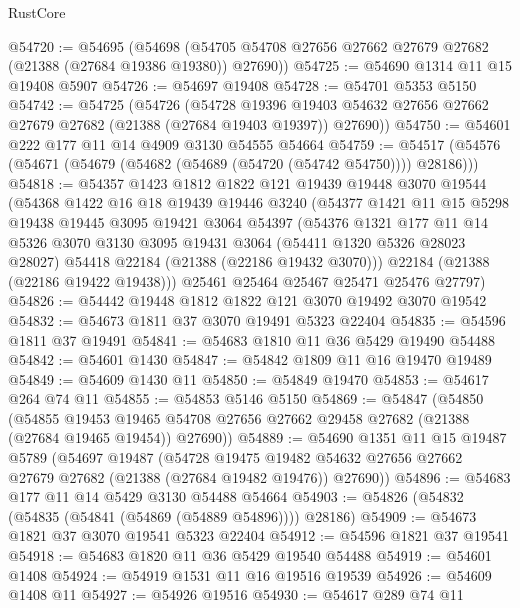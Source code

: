 \begin{lexlean}{RustCore}
\begin{coremodule}
@54720 := @54695
    (@54698 (@54705 @54708 @27656 @27662 @27679 @27682 (@21388 (@27684 @19386 @19380)) @27690))
@54725 := @54690 @1314 @11 @15 @19408 @5907
@54726 := @54697 @19408
@54728 := @54701 @5353 @5150
@54742 := @54725
    (@54726
      (@54728
        @19396
        @19403
        @54632
        @27656
        @27662
        @27679
        @27682
        (@21388 (@27684 @19403 @19397))
        @27690))
@54750 := @54601 @222 @177 @11 @14 @4909 @3130 @54555 @54664
@54759 := @54517 (@54576 (@54671 (@54679 (@54682 (@54689 (@54720 (@54742 @54750)))) @28186)))
@54818 := @54357
    @1423
    @1812
    @1822
    @121
    @19439
    @19448
    @3070
    @19544
    (@54368
      @1422
      @16
      @18
      @19439
      @19446
      @3240
      (@54377
        @1421
        @11
        @15
        @5298
        @19438
        @19445
        @3095
        @19421
        @3064
        @54397
        (@54376
          @1321
          @177
          @11
          @14
          @5326
          @3070
          @3130
          @3095
          @19431
          @3064
          (@54411 @1320 @5326 @28023 @28027)
          @54418
          @22184
          (@21388 (@22186 @19432 @3070)))
        @22184
        (@21388 (@22186 @19422 @19438)))
      @25461
      @25464
      @25467
      @25471
      @25476
      @27797)
@54826 := @54442 @19448 @1812 @1822 @121 @3070 @19492 @3070 @19542
@54832 := @54673 @1811 @37 @3070 @19491 @5323 @22404
@54835 := @54596 @1811 @37 @19491
@54841 := @54683 @1810 @11 @36 @5429 @19490 @54488
@54842 := @54601 @1430
@54847 := @54842 @1809 @11 @16 @19470 @19489
@54849 := @54609 @1430 @11
@54850 := @54849 @19470
@54853 := @54617 @264 @74 @11
@54855 := @54853 @5146 @5150
@54869 := @54847
    (@54850
      (@54855
        @19453
        @19465
        @54708
        @27656
        @27662
        @29458
        @27682
        (@21388 (@27684 @19465 @19454))
        @27690))
@54889 := @54690
    @1351
    @11
    @15
    @19487
    @5789
    (@54697
      @19487
      (@54728
        @19475
        @19482
        @54632
        @27656
        @27662
        @27679
        @27682
        (@21388 (@27684 @19482 @19476))
        @27690))
@54896 := @54683 @177 @11 @14 @5429 @3130 @54488 @54664
@54903 := @54826 (@54832 (@54835 (@54841 (@54869 (@54889 @54896)))) @28186)
@54909 := @54673 @1821 @37 @3070 @19541 @5323 @22404
@54912 := @54596 @1821 @37 @19541
@54918 := @54683 @1820 @11 @36 @5429 @19540 @54488
@54919 := @54601 @1408
@54924 := @54919 @1531 @11 @16 @19516 @19539
@54926 := @54609 @1408 @11
@54927 := @54926 @19516
@54930 := @54617 @289 @74 @11

\end{coremodule}
\end{lexlean}
